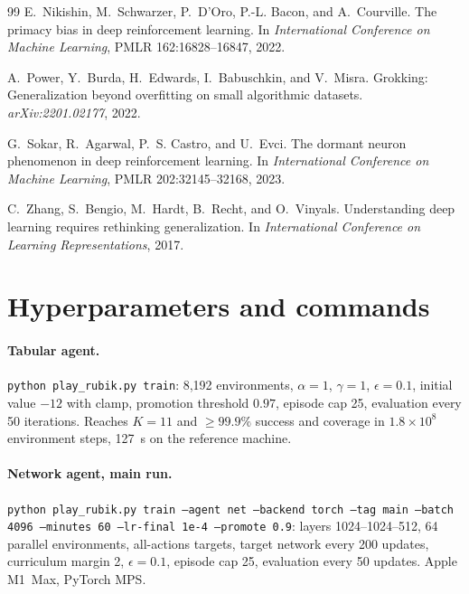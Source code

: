 \documentclass[11pt]{article}
\begin{document}
\begin{thebibliography}{99}
E.~Nikishin, M.~Schwarzer, P.~D'Oro, P.-L. Bacon, and A.~Courville.
\newblock The primacy bias in deep reinforcement learning.
\newblock In \emph{International Conference on Machine Learning}, PMLR 162:16828--16847, 2022.

A.~Power, Y.~Burda, H.~Edwards, I.~Babuschkin, and V.~Misra.
\newblock Grokking: Generalization beyond overfitting on small algorithmic datasets.
\newblock \emph{arXiv:2201.02177}, 2022.

G.~Sokar, R.~Agarwal, P.~S. Castro, and U.~Evci.
\newblock The dormant neuron phenomenon in deep reinforcement learning.
\newblock In \emph{International Conference on Machine Learning}, PMLR 202:32145--32168, 2023.

C.~Zhang, S.~Bengio, M.~Hardt, B.~Recht, and O.~Vinyals.
\newblock Understanding deep learning requires rethinking generalization.
\newblock In \emph{International Conference on Learning Representations}, 2017.
\end{thebibliography}

\appendix
\section{Hyperparameters and commands}

\paragraph{Tabular agent.}
\texttt{python play\_rubik.py train}: 8{,}192 environments, $\alpha=1$, $\gamma=1$,
$\epsilon=0.1$, initial value $-12$ with clamp, promotion threshold $0.97$, episode cap 25,
evaluation every 50 iterations. Reaches $K=11$ and $\ge99.9\%$ success and coverage in
$1.8\times10^8$ environment steps, 127~s on the reference machine.

\paragraph{Network agent, main run.}
\texttt{python play\_rubik.py train --agent net --backend torch --tag main --batch 4096
--minutes 60 --lr-final 1e-4 --promote 0.9}: layers 1024--1024--512, 64 parallel
environments, all-actions targets, target network every 200 updates, curriculum margin 2,
$\epsilon=0.1$, episode cap 25, evaluation every 50 updates. Apple M1~Max, PyTorch MPS.
\end{document}
